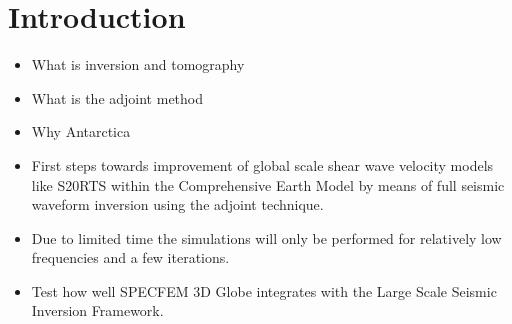 \chapter{Introduction}



\begin{itemize}
\item What is inversion and tomography 
\item What is the adjoint method
\item Why Antarctica
\item First steps towards improvement of global scale shear wave velocity models like S20RTS within the Comprehensive Earth Model by means of full seismic waveform inversion using the adjoint technique. 
\item Due to limited time the simulations will only be performed for relatively low frequencies and a few iterations.
\item Test how well SPECFEM 3D Globe integrates with the Large Scale Seismic Inversion Framework.
\end{itemize}
